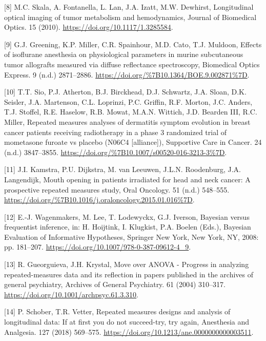 \documentclass[
]{article}
\begin{document}
\leavevmode\hypertarget{ref-skala2010}{}%
{[}8{]} M.C. Skala, A. Fontanella, L. Lan, J.A. Izatt, M.W. Dewhirst, Longitudinal optical imaging of tumor metabolism and hemodynamics, Journal of Biomedical Optics. 15 (2010). \url{https://doi.org/10.1117/1.3285584}.

\leavevmode\hypertarget{ref-greening2018}{}%
{[}9{]} G.J. Greening, K.P. Miller, C.R. Spainhour, M.D. Cato, T.J. Muldoon, Effects of isoflurane anesthesia on physiological parameters in murine subcutaneous tumor allografts measured via diffuse reflectance spectroscopy, Biomedical Optics Express. 9 (n.d.) 2871--2886. \url{https://doi.org/\%7B10.1364/BOE.9.002871\%7D}.

\leavevmode\hypertarget{ref-sio2016}{}%
{[}10{]} T.T. Sio, P.J. Atherton, B.J. Birckhead, D.J. Schwartz, J.A. Sloan, D.K. Seisler, J.A. Martenson, C.L. Loprinzi, P.C. Griffin, R.F. Morton, J.C. Anders, T.J. Stoffel, R.E. Haselow, R.B. Mowat, M.A.N. Wittich, J.D. Bearden III, R.C. Miller, Repeated measures analyses of dermatitis symptom evolution in breast cancer patients receiving radiotherapy in a phase 3 randomized trial of mometasone furoate vs placebo (N06C4 {[}alliance{]}), Supportive Care in Cancer. 24 (n.d.) 3847--3855. \url{https://doi.org/\%7B10.1007/s00520-016-3213-3\%7D}.

\leavevmode\hypertarget{ref-kamstra2015}{}%
{[}11{]} J.I. Kamstra, P.U. Dijkstra, M. van Leeuwen, J.L.N. Roodenburg, J.A. Langendijk, Mouth opening in patients irradiated for head and neck cancer: A prospective repeated measures study, Oral Oncology. 51 (n.d.) 548--555. \url{https://doi.org/\%7B10.1016/j.oraloncology.2015.01.016\%7D}.

\leavevmode\hypertarget{ref-wagenmakers2008}{}%
{[}12{]} E.-J. Wagenmakers, M. Lee, T. Lodewyckx, G.J. Iverson, Bayesian versus frequentist inference, in: H. Hoijtink, I. Klugkist, P.A. Boelen (Eds.), Bayesian Evaluation of Informative Hypotheses, Springer New York, New York, NY, 2008: pp. 181--207. \url{https://doi.org/10.1007/978-0-387-09612-4_9}.

\leavevmode\hypertarget{ref-gueorguieva2004}{}%
{[}13{]} R. Gueorguieva, J.H. Krystal, Move over ANOVA - Progress in analyzing repeated-measures data and its reflection in papers published in the archives of general psychiatry, Archives of General Psychiatry. 61 (2004) 310--317. \url{https://doi.org/10.1001/archpsyc.61.3.310}.

\leavevmode\hypertarget{ref-schober2018}{}%
{[}14{]} P. Schober, T.R. Vetter, Repeated measures designs and analysis of longitudinal data: If at first you do not succeed-try, try again, Anesthesia and Analgesia. 127 (2018) 569--575. \url{https://doi.org/10.1213/ane.0000000000003511}.
\end{document}

